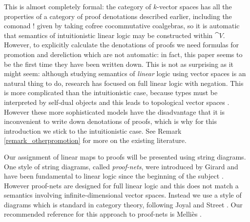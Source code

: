 \documentclass[english,letter paper,12pt,reqno]{article}
\theoremstyle{example}
\numberwithin{equation}{section}
\begin{document}
This is almost completely formal: the category of $k$-vector spaces has all the properties of a category of proof denotations described earlier, including the comonad ${!}$ given by taking cofree cocommutative coalgebras, so it is automatic that semantics of intuitionistic linear logic may be constructed within $\cat{V}$. However, to explicitly calculate the denotations of proofs we need formulas for promotion and dereliction which are not automatic: in fact, this paper seems to be the first time they have been written down. This is not as surprising as it might seem: although studying semantics of \emph{linear} logic using vector spaces is an natural thing to do, research has focused on full linear logic with negation. This is more complicated than the intuitionistic case, because types must be interpreted by self-dual objects and this leads to topological vector spaces \cite{barr_auto, barr_acc, blute,blute_scott,girard_coherentbanach,ehrhard, ehrhard_kothe}.  However these more sophisticated models have the disadvantage that it is inconvenient to write down denotations of proofs, which is why for this introduction we stick to the intuitionistic case. See Remark \ref{remark_otherpromotion} for more on the existing literature.

Our assignment of linear maps to proofs will be presented using string diagrams. One style of string diagrams, called \emph{proof-nets}, were introduced by Girard and have been fundamental to linear logic since the beginning of the subject \cite{girard_llogic}. However proof-nets are designed for full linear logic and this does not match a semantics involving infinite-dimensional vector spaces. Instead we use a style of diagrams which is standard in category theory, following Joyal and Street \cite{JSGoTCI,JSGoTCII,ladia,khovdia}. Our recommended reference for this approach to proof-nets is Melli\`{e}s \cite{mellies, mellies_dia}.
\\
\end{document}
